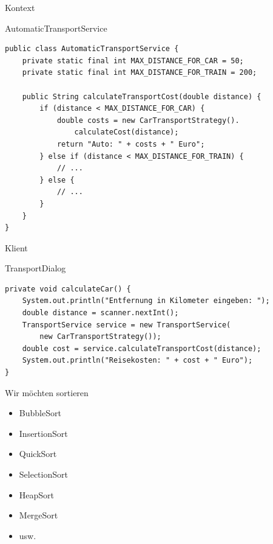 \begin{frame}[fragile]{Kontext}
	\begin{exampleblock}{AutomaticTransportService}
 		\begin{lstlisting}
public class AutomaticTransportService {
	private static final int MAX_DISTANCE_FOR_CAR = 50;
	private static final int MAX_DISTANCE_FOR_TRAIN = 200;
	
	public String calculateTransportCost(double distance) {
		if (distance < MAX_DISTANCE_FOR_CAR) {
			double costs = new CarTransportStrategy().
                calculateCost(distance);
			return "Auto: " + costs + " Euro";
		} else if (distance < MAX_DISTANCE_FOR_TRAIN) {
			// ...
		} else {
			// ...
		}
	}
}
 		\end{lstlisting}
 	\end{exampleblock}
\end{frame}

\begin{frame}[fragile]{Klient}
	\begin{exampleblock}{TransportDialog}
 		\begin{lstlisting}
private void calculateCar() {
    System.out.println("Entfernung in Kilometer eingeben: ");
    double distance = scanner.nextInt();
    TransportService service = new TransportService(
        new CarTransportStrategy());
    double cost = service.calculateTransportCost(distance);
    System.out.println("Reisekosten: " + cost + " Euro");
}    
 		\end{lstlisting}
 	\end{exampleblock}
\end{frame}


\begin{frame}{Wir möchten sortieren}
	\begin{itemize}
 		\item BubbleSort
 		\item InsertionSort
 		\item QuickSort
 		\item SelectionSort
 		\item HeapSort
 		\item MergeSort
 		\item usw.
 	\end{itemize}
\end{frame}

